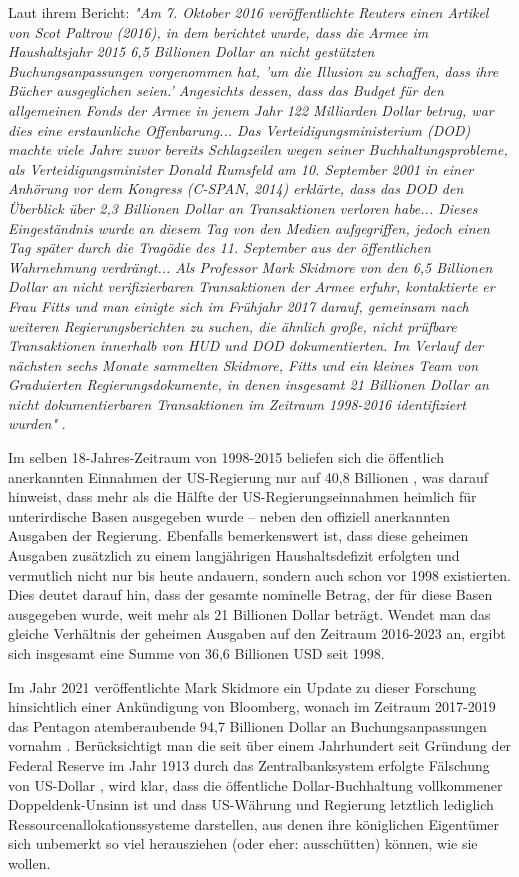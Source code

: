 \documentclass[10pt,twocolumn,letterpaper]{article}
\begin{document}
Laut ihrem Bericht: \textit{"Am 7. Oktober 2016 veröffentlichte Reuters einen Artikel von Scot Paltrow (2016), in dem berichtet wurde, dass die Armee im Haushaltsjahr 2015 6,5 Billionen Dollar an nicht gestützten Buchungsanpassungen vorgenommen hat, 'um die Illusion zu schaffen, dass ihre Bücher ausgeglichen seien.' Angesichts dessen, dass das Budget für den allgemeinen Fonds der Armee in jenem Jahr 122 Milliarden Dollar betrug, war dies eine erstaunliche Offenbarung... Das Verteidigungsministerium (DOD) machte viele Jahre zuvor bereits Schlagzeilen wegen seiner Buchhaltungsprobleme, als Verteidigungsminister Donald Rumsfeld am 10. September 2001 in einer Anhörung vor dem Kongress (C-SPAN, 2014) erklärte, dass das DOD den Überblick über 2,3 Billionen Dollar an Transaktionen verloren habe... Dieses Eingeständnis wurde an diesem Tag von den Medien aufgegriffen, jedoch einen Tag später durch die Tragödie des 11. September aus der öffentlichen Wahrnehmung verdrängt... Als Professor Mark Skidmore von den 6,5 Billionen Dollar an nicht verifizierbaren Transaktionen der Armee erfuhr, kontaktierte er Frau Fitts und man einigte sich im Frühjahr 2017 darauf, gemeinsam nach weiteren Regierungsberichten zu suchen, die ähnlich große, nicht prüfbare Transaktionen innerhalb von HUD und DOD dokumentierten. Im Verlauf der nächsten sechs Monate sammelten Skidmore, Fitts und ein kleines Team von Graduierten Regierungsdokumente, in denen insgesamt 21 Billionen Dollar an nicht dokumentierbaren Transaktionen im Zeitraum 1998-2016 identifiziert wurden"} \cite{12}.

Im selben 18-Jahres-Zeitraum von 1998-2015 beliefen sich die öffentlich anerkannten Einnahmen der US-Regierung nur auf 40,8 Billionen \cite{15}, was darauf hinweist, dass mehr als die Hälfte der US-Regierungseinnahmen heimlich für unterirdische Basen ausgegeben wurde – neben den offiziell anerkannten Ausgaben der Regierung. Ebenfalls bemerkenswert ist, dass diese geheimen Ausgaben zusätzlich zu einem langjährigen Haushaltsdefizit erfolgten und vermutlich nicht nur bis heute andauern, sondern auch schon vor 1998 existierten. Dies deutet darauf hin, dass der gesamte nominelle Betrag, der für diese Basen ausgegeben wurde, weit mehr als 21 Billionen Dollar beträgt. Wendet man das gleiche Verhältnis der geheimen Ausgaben auf den Zeitraum 2016-2023 an, ergibt sich insgesamt eine Summe von 36,6 Billionen USD seit 1998.

Im Jahr 2021 veröffentlichte Mark Skidmore ein Update zu dieser Forschung hinsichtlich einer Ankündigung von Bloomberg, wonach im Zeitraum 2017-2019 das Pentagon atemberaubende 94,7 Billionen Dollar an Buchungsanpassungen vornahm \cite{17,18}. Berücksichtigt man die seit über einem Jahrhundert seit Gründung der Federal Reserve im Jahr 1913 durch das Zentralbanksystem erfolgte Fälschung von US-Dollar \cite{37}, wird klar, dass die öffentliche Dollar-Buchhaltung vollkommener Doppeldenk-Unsinn ist und dass US-Währung und Regierung letztlich lediglich Ressourcenallokationssysteme darstellen, aus denen ihre königlichen Eigentümer sich unbemerkt so viel herausziehen (oder eher: ausschütten) können, wie sie wollen.
\end{document}
